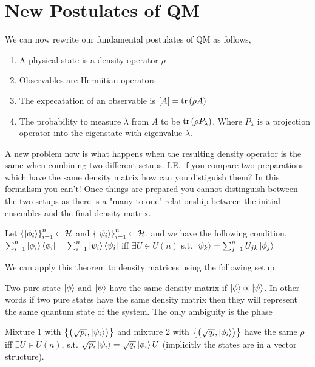 \section{New Postulates of QM}
We can now rewrite our fundamental postulates of QM as follows,
\begin{enumerate}
    \item A physical state is a density operator $\rho$
    \item Observables are Hermitian operators
    \item The expecatation of an observable is $\left[A\right] = \operatorname{tr} \left(\rho A\right)$
    \item The probability to measure $\lambda$ from $A$ to be
        $\operatorname{tr} \left(\rho P_{\lambda}\right)$. Where $P_{\lambda}$ is a projection
        operator into the eigenstate with eigenvalue $\lambda$.
\end{enumerate}
A new problem now is what happens when the resulting density operator is the same
when combining two different setups. I.E. if you compare two preparations which have
the same density matrix how can you distiguish them? In this formalism you can't!
Once things are prepared you cannot distinguish between the two setups as there is
a "many-to-one" relationship between the initial ensembles and the final
density matrix.

\begin{theorem}[Unknown]
\label{unknown}
Let $\left\{\Ket{\phi_i}\right\}_{i=1}^{n} \subset \mathcal{H}$ and
$\left\{\Ket{\psi_i}\right\}_{i=1}^{n} \subset \mathcal{H}$, and we have
the following condition,
$\sum_{i=1}^{n} \Ket{\phi_i}\Bra{\phi_i} = 
\sum_{i=1}^{n} \Ket{\psi_i}\Bra{\psi_i}$ iff
$\exists U \in U(n)$ s.t. 
$\Ket{\psi_k} = \sum_{j=1}^{n} U_{jk} \Ket{\phi_j}$
\end{theorem}

We can apply this theorem to density matrices using the following setup
\begin{corollary}
Two pure state $\Ket{\phi}$ and $\Ket{\psi}$ have the same
density matrix if $\Ket{\phi} \propto \Ket{\psi}$. In other words
if two pure states have the same density matrix then they will represent
the same quantum state of the system. The only ambiguity is the phase
\end{corollary}

\begin{corollary}
Mixture 1 with $\left\{\left(\sqrt{p_i}, \Ket{\psi_i}\right)\right\}$
and mixture 2 with $\left\{\left(\sqrt{q_i}, \Ket{\phi_i}\right)\right\}$
have the same $\rho$ iff $\exists U \in U(n)$, s.t.
$\sqrt{p_i} \Ket{\psi_i} = \sqrt{q_i} \Ket{\phi_i} U$ (implicitly
the states are in a vector structure).
\end{corollary}

